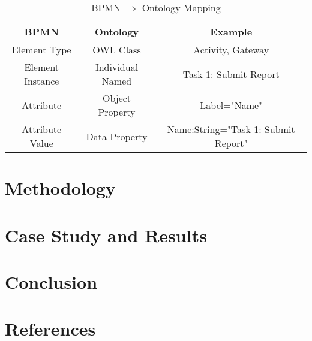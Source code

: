 \documentclass{llncs}
\begin{document}
\begin{table}
	\label{BPMNOntologyMapping}
	\caption{BPMN $\Rightarrow$ Ontology Mapping}
	\centering
	\begin{tabular}{ccc}
		\hline
		BPMN & Ontology & Example \\
		\hline
		Element Type & OWL Class & Activity, Gateway \\
		Element Instance & Individual Named & Task 1: Submit Report \\  
		Attribute & Object Property & Label="Name" \\
		Attribute Value & Data Property & Name:String="Task 1: Submit Report" \\ 
		\hline
	\end{tabular} 
\end{table}

\section{Methodology}\label{Methodology}



\section{Case Study and Results}\label{CaseStudy}
\section{Conclusion}\label{Conclusion}
\section{References}\label{References}



\end{document}
